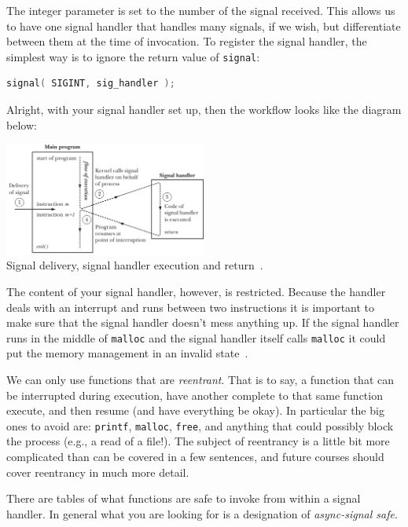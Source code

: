 The integer parameter is set to the number of the signal received. This allows us to have one signal handler that handles many signals, if we wish, but differentiate between them at the time of invocation. To register the signal handler, the simplest way is to ignore the return value of \texttt{signal}:

\begin{lstlisting}[language=C]
signal( SIGINT, sig_handler );
\end{lstlisting}

Alright, with your signal handler set up, then the workflow looks like the diagram below:

\begin{center}
	\includegraphics[width=0.5\textwidth]{images/sighandler.png}\\
	Signal delivery, signal handler execution and return~\cite{lpi}.
\end{center}

The content of your signal handler, however, is restricted. Because the handler deals with an interrupt and runs between two instructions it is important to make sure that the signal handler doesn't mess anything up. If the signal handler runs in the middle of \texttt{malloc} and the signal handler itself calls \texttt{malloc} it could put the memory management in an invalid state~\cite{apunix}.

We can only use functions that are \textit{reentrant}. That is to say, a function that can be interrupted during execution, have another complete to that same function execute, and then resume (and have everything be okay). In particular the big ones to avoid are: \texttt{printf}, \texttt{malloc}, \texttt{free}, and anything that could possibly block the process (e.g., a read of a file!). The subject of reentrancy is a little bit more complicated than can be covered in a few sentences, and future courses should cover reentrancy in much more detail.

There are tables of what functions are safe to invoke from within a signal handler. In general what you are looking for is a designation of \textit{async-signal safe}.


